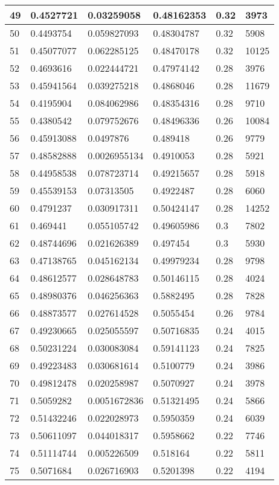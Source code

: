 \begin{longtable}{|l|l|l|l|l|l|}
49 & 0.4527721 & 0.03259058 & 0.48162353 & 0.32 & 3973 \\ \hline 
50 & 0.4493754 & 0.059827093 & 0.48304787 & 0.32 & 5908 \\ \hline 
51 & 0.45077077 & 0.062285125 & 0.48470178 & 0.32 & 10125 \\ \hline 
52 & 0.4693616 & 0.022444721 & 0.47974142 & 0.28 & 3976 \\ \hline 
53 & 0.45941564 & 0.039275218 & 0.4868046 & 0.28 & 11679 \\ \hline 
54 & 0.4195904 & 0.084062986 & 0.48354316 & 0.28 & 9710 \\ \hline 
55 & 0.4380542 & 0.079752676 & 0.48496336 & 0.26 & 10084 \\ \hline 
56 & 0.45913088 & 0.0497876 & 0.489418 & 0.26 & 9779 \\ \hline 
57 & 0.48582888 & 0.0026955134 & 0.4910053 & 0.28 & 5921 \\ \hline 
58 & 0.44958538 & 0.078723714 & 0.49215657 & 0.28 & 5918 \\ \hline 
59 & 0.45539153 & 0.07313505 & 0.4922487 & 0.28 & 6060 \\ \hline 
60 & 0.4791237 & 0.030917311 & 0.50424147 & 0.28 & 14252 \\ \hline 
61 & 0.469441 & 0.055105742 & 0.49605986 & 0.3 & 7802 \\ \hline 
62 & 0.48744696 & 0.021626389 & 0.497454 & 0.3 & 5930 \\ \hline 
63 & 0.47138765 & 0.045162134 & 0.49979234 & 0.28 & 9798 \\ \hline 
64 & 0.48612577 & 0.028648783 & 0.50146115 & 0.28 & 4024 \\ \hline 
65 & 0.48980376 & 0.046256363 & 0.5882495 & 0.28 & 7828 \\ \hline 
66 & 0.48873577 & 0.027614528 & 0.5055454 & 0.26 & 9784 \\ \hline 
67 & 0.49230665 & 0.025055597 & 0.50716835 & 0.24 & 4015 \\ \hline 
68 & 0.50231224 & 0.030083084 & 0.59141123 & 0.24 & 7825 \\ \hline 
69 & 0.49223483 & 0.030681614 & 0.5100779 & 0.24 & 3986 \\ \hline 
70 & 0.49812478 & 0.020258987 & 0.5070927 & 0.24 & 3978 \\ \hline 
71 & 0.5059282 & 0.0051672836 & 0.51321495 & 0.24 & 5866 \\ \hline 
72 & 0.51432246 & 0.022028973 & 0.5950359 & 0.24 & 6039 \\ \hline 
73 & 0.50611097 & 0.044018317 & 0.5958662 & 0.22 & 7746 \\ \hline 
74 & 0.51114744 & 0.005226509 & 0.518164 & 0.22 & 5811 \\ \hline 
75 & 0.5071684 & 0.026716903 & 0.5201398 & 0.22 & 4194 \\ \hline 
\end{longtable}